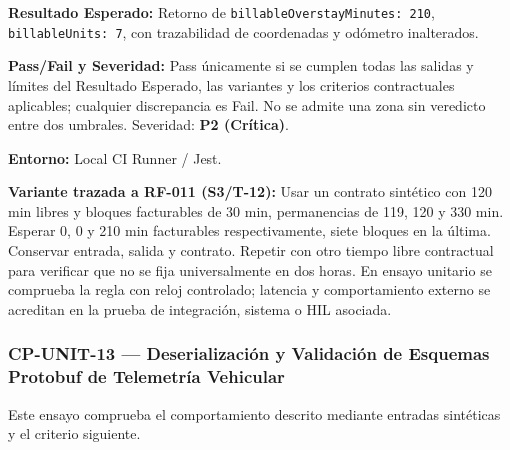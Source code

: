 \par\noindent\textbf{Resultado Esperado:} Retorno de \texttt{b\allowbreak{}i\allowbreak{}l\allowbreak{}l\allowbreak{}a\allowbreak{}b\allowbreak{}l\allowbreak{}e\allowbreak{}O\allowbreak{}v\allowbreak{}e\allowbreak{}r\allowbreak{}s\allowbreak{}t\allowbreak{}a\allowbreak{}y\allowbreak{}M\allowbreak{}i\allowbreak{}n\allowbreak{}u\allowbreak{}t\allowbreak{}e\allowbreak{}s\allowbreak{}:\allowbreak{} 2\allowbreak{}1\allowbreak{}0\allowbreak{}}, \texttt{b\allowbreak{}i\allowbreak{}l\allowbreak{}l\allowbreak{}a\allowbreak{}b\allowbreak{}l\allowbreak{}e\allowbreak{}U\allowbreak{}n\allowbreak{}i\allowbreak{}t\allowbreak{}s\allowbreak{}:\allowbreak{} 7\allowbreak{}}, con trazabilidad de coordenadas y odómetro inalterados.\par
\par\noindent\textbf{Pass/Fail y Severidad:} Pass únicamente si se cumplen todas las salidas y límites del Resultado Esperado, las variantes y los criterios contractuales aplicables; cualquier discrepancia es Fail. No se admite una zona sin veredicto entre dos umbrales. Severidad: \textbf{P2 (Crítica)}.\par
\par\noindent\textbf{Entorno:} Local CI Runner / Jest.\par







\par\noindent\textbf{Variante trazada a RF-011 (S3/T-12):} Usar un contrato sintético con 120 min libres y bloques facturables de 30 min, permanencias de 119, 120 y 330 min. Esperar 0, 0 y 210 min facturables respectivamente, siete bloques en la última. Conservar entrada, salida y contrato. Repetir con otro tiempo libre contractual para verificar que no se fija universalmente en dos horas. En ensayo unitario se comprueba la regla con reloj controlado; latencia y comportamiento externo se acreditan en la prueba de integración, sistema o HIL asociada.\par
\subsubsection*{CP-UNIT-13 — Deserialización y Validación de Esquemas Protobuf de Telemetría Vehicular}\label{sec:9-cp-unit-13}

Este ensayo comprueba el comportamiento descrito mediante entradas sintéticas y el criterio siguiente.

